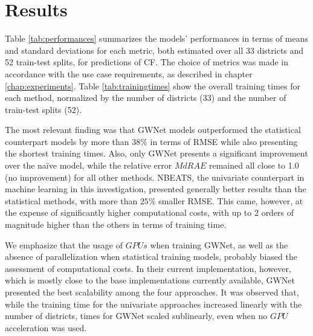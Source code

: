 \chapter{Results}

Table \ref{tab:performances} summarizes the models' performances in terms of means and standard deviations for each metric, both estimated over all 33 districts and 52 train-test splits, for predictions of CF.
The choice of metrics was made in accordance with the use case requirements, as described in chapter \ref{chap:experiments}.
Table \ref{tab:trainingtimes} show the overall training times for each method, normalized by the number of districts (33) and the number of train-test splits (52).

The most relevant finding was that GWNet models outperformed the statistical counterpart models by more than $38\%$ in terms of RMSE while also presenting the shortest training times.
Also, only GWNet presents a significant improvement over the naïve model, while the relative error $MdRAE$ remained all close to 1.0 (no improvement) for all other methods.
NBEATS, the univariate counterpart in machine learning in this investigation, presented generally better results than the statistical methods, with more than $25\%$ smaller RMSE.
This came, however, at the expense of significantly higher computational costs, with up to 2 orders of magnitude higher than the others in terms of training time.

We emphasize that the usage of $GPUs$ when training GWNet, as well as the absence of parallelization when statistical training models, probably biased the assessment of computational costs.
In their current implementation, however, which is mostly close to the base implementations currently available, GWNet presented the best scalability among the four approaches.
It was observed that, while the training time for the univariate approaches increased linearly with the number of districts, times for GWNet scaled sublinearly, even when no $GPU$ acceleration was used.


\begin{table}
\centering
\caption{Performances of different forecasting approaches for the wind power generation use case. Metrics are calculated on basis of CF values at test timestamps.}
\label{tab:performances}
\end{table}

